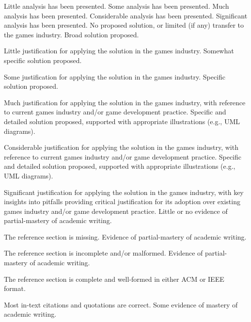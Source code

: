 \documentclass{../../fal_assignment}
\begin{document}
\begin{markingrubric}
        \grade 		Little analysis has been presented.
        \grade 		Some analysis has been presented. 
        \grade 		Much analysis has been presented.
        \grade 		Considerable analysis has been presented.
        \grade 		Significant analysis has been presented.
%
        \grade\fail 	No proposed solution, or limited (if any) transfer to the games industry.
        \grade 		Broad solution proposed. 
        \par 		Little justification for applying the solution in the games industry.
        \grade 		Somewhat specific solution proposed. 
        \par                 Some justification for applying the solution in the games industry. 
        \grade 		Specific solution proposed.
         \par                Much justification for applying the solution in the games industry, with reference to current games industry and/or game development practice. 
         \grade 	          Specific and detailed solution proposed, supported with appropriate illustrations (e.g., UML diagrams).
         \par                Considerable justification for applying the solution in the games industry, with reference to current games industry and/or game development practice.         
         \grade 	          Specific and detailed solution proposed, supported with appropriate illustrations (e.g., UML diagrams).
         \par                Significant justification for applying the solution in the games industry, with key insights into pitfalls providing critical justification for its adoption over existing games industry and/or game development practice.
%
        \grade\fail 	Little or no evidence of partial-mastery of academic writing.
        \par 		The reference section is missing.
        \grade 		Evidence of partial-mastery of academic writing.
        \par 		The reference section is incomplete and/or malformed.
        \grade 		Evidence of partial-mastery of academic writing.
        \par 		The reference section is complete and well-formed in either ACM or IEEE format.
        \par 		Most in-text citations and quotations are correct.
        \grade 		Some evidence of mastery of academic writing.

\end{markingrubric}
\end{document}
